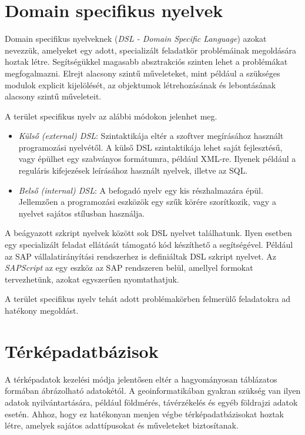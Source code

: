 
\section{Domain specifikus nyelvek}

Domain specifikus nyelveknek (\textit{DSL - Domain Specific Language}) azokat nevezzük, amelyeket egy adott, specializált feladatkör problémáinak megoldására hoztak létre. Segítségükkel magasabb absztrakciós szinten lehet a problémákat megfogalmazni. Elrejt alacsony szintű műveleteket, mint például a szükséges modulok explicit kijelölését, az objektumok létrehozásának és lebontásának alacsony szintű műveleteit.

A terület specifikus nyelv az alábbi módokon jelenhet meg.

\begin{itemize}
\item \textit{Külső (external) DSL}: Szintaktikája eltér a szoftver megírásához használt programozási nyelvétől. A külső DSL szintaktikája lehet saját fejlesztésű, vagy épülhet egy szabványos formátumra, például XML-re. Ilyenek például a reguláris kifejezések leírásához használt nyelvek, illetve az SQL.
\item \textit{Belső (internal) DSL}: A befogadó nyelv egy kis részhalmazára épül. Jellemzően a programozási eszközök egy szűk körére szorítkozik, vagy a nyelvet sajátos stílusban használja.
\end{itemize}


A beágyazott szkript nyelvek között sok DSL nyelvet találhatunk. Ilyen esetben egy specializált feladat ellátását támogató kód készíthető a segítségével. Például az SAP vállalatirányítási rendszerhez is definiáltak  DSL szkript nyelvet. Az \textit{SAPScript} az egy eszköz az SAP rendszeren belül, amellyel formokat tervezhetünk, azokat egyszerűen nyomtathatjuk.

A terület specifikus nyelv tehát adott problémakörben felmerülő feladatokra ad hatékony megoldást.

\section{Térképadatbázisok}

A térképadatok kezelési módja jelentősen eltér a hagyományosan táblázatos formában ábrázolható adatokétól. A geoinformatikában gyakran szükség van ilyen adatok nyilvántartására, például földmérés, távérzékelés és egyéb földrajzi adatok esetén. Ahhoz, hogy ez hatékonyan menjen végbe térképadatbázisokat hoztak létre, amelyek sajátos adattípusokat és műveleteket biztosítanak.

